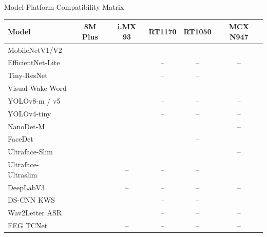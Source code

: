 \documentclass[aspectratio=169]{beamer}
\begin{document}
\begin{frame}{Model-Platform Compatibility Matrix}
  \centering\scriptsize
  \newcommand{\yes}{\textcolor{NXPBlue}{\textbf{\checkmark}}}
  \newcommand{\no}{\textcolor{NXPGray}{--}}
  \begin{tabular}{lccccc}
    \toprule
    \textbf{Model} & \textbf{8M Plus} & \textbf{i.MX 93} & \textbf{RT1170} & \textbf{RT1050} & \textbf{MCX N947} \\
    \midrule
    MobileNetV1/V2    & \yes & \yes & \no  & \no  & \no  \\
    EfficientNet-Lite & \yes & \yes & \no  & \no  & \no  \\
    Tiny-ResNet       & \yes & \yes & \no  & \no  & \yes \\
    Visual Wake Word  & \yes & \yes & \no  & \no  & \yes \\
    YOLOv8-m / v5     & \yes & \yes & \no  & \no  & \no  \\
    YOLOv4-tiny       & \yes & \yes & \no  & \no  & \no  \\
    NanoDet-M         & \yes & \yes & \yes & \yes & \no  \\
    FaceDet           & \yes & \yes & \yes & \no  & \yes \\
    Ultraface-Slim    & \yes & \yes & \yes & \yes & \no  \\
    Ultraface-Ultraslim & \yes & \no & \no & \no  & \yes \\
    DeepLabV3         & \yes & \no  & \no  & \no  & \no  \\
    DS-CNN KWS        & \yes & \yes & \no  & \no  & \yes \\
    Wav2Letter ASR    & \yes & \yes & \no  & \no  & \no  \\
    EEG TCNet         & \yes & \no  & \no  & \no  & \no  \\
    \bottomrule
  \end{tabular}
\end{frame}
\end{document}
